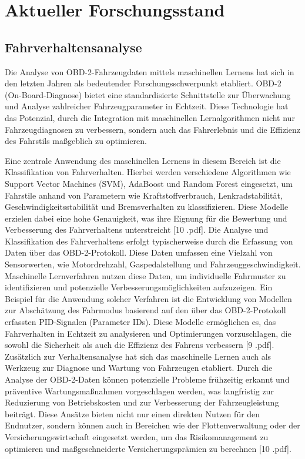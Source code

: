\documentclass[oneside]{ausarbeitung}
\begin{document}

\chapter{Aktueller Forschungsstand}
\label{cha:forschungsstand}

\section{Fahrverhaltensanalyse}
\label{sec:research_fahrverhalten}

Die Analyse von OBD-2-Fahrzeugdaten mittels maschinellen Lernens hat sich in den letzten Jahren als bedeutender Forschungsschwerpunkt etabliert. OBD-2 (On-Board-Diagnose) bietet eine standardisierte Schnittstelle zur Überwachung und Analyse zahlreicher Fahrzeugparameter in Echtzeit. Diese Technologie hat das Potenzial, durch die Integration mit maschinellen Lernalgorithmen nicht nur Fahrzeugdiagnosen zu verbessern, sondern auch das Fahrerlebnis und die Effizienz des Fahrstils maßgeblich zu optimieren.

Eine zentrale Anwendung des maschinellen Lernens in diesem Bereich ist die Klassifikation von Fahrverhalten. Hierbei werden verschiedene Algorithmen wie Support Vector Machines (SVM), AdaBoost und Random Forest eingesetzt, um Fahrstile anhand von Parametern wie Kraftstoffverbrauch, Lenkradstabilität, Geschwindigkeitsstabilität und Bremsverhalten zu klassifizieren. Diese Modelle erzielen dabei eine hohe Genauigkeit, was ihre Eignung für die Bewertung und Verbesserung des Fahrverhaltens unterstreicht [10
.pdf].
Die Analyse und Klassifikation des Fahrverhaltens erfolgt typischerweise durch die Erfassung von Daten über das OBD-2-Protokoll. Diese Daten umfassen eine Vielzahl von Sensorwerten, wie Motordrehzahl, Gaspedalstellung und Fahrzeuggeschwindigkeit. Maschinelle Lernverfahren nutzen diese Daten, um individuelle Fahrmuster zu identifizieren und potenzielle Verbesserungsmöglichkeiten aufzuzeigen. Ein Beispiel für die Anwendung solcher Verfahren ist die Entwicklung von Modellen zur Abschätzung des Fahrmodus basierend auf den über das OBD-2-Protokoll erfassten PID-Signalen (Parameter IDs). Diese Modelle ermöglichen es, das Fahrverhalten in Echtzeit zu analysieren und Optimierungen vorzuschlagen, die sowohl die Sicherheit als auch die Effizienz des Fahrens verbessern [9
.pdf].
Zusätzlich zur Verhaltensanalyse hat sich das maschinelle Lernen auch als Werkzeug zur Diagnose und Wartung von Fahrzeugen etabliert. Durch die Analyse der OBD-2-Daten können potenzielle Probleme frühzeitig erkannt und präventive Wartungsmaßnahmen vorgeschlagen werden, was langfristig zur Reduzierung von Betriebskosten und zur Verbesserung der Fahrzeugleistung beiträgt. Diese Ansätze bieten nicht nur einen direkten Nutzen für den Endnutzer, sondern können auch in Bereichen wie der Flottenverwaltung oder der Versicherungswirtschaft eingesetzt werden, um das Risikomanagement zu optimieren und maßgeschneiderte Versicherungsprämien zu berechnen [10
.pdf].
\end{document}
